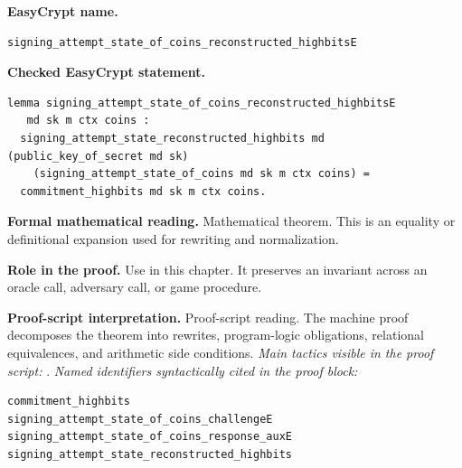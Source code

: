 \begin{formaltheorem}
\noindent\textbf{EasyCrypt name.}
\begin{lstlisting}[language=EasyCrypt,basicstyle=\ttfamily\scriptsize]
signing_attempt_state_of_coins_reconstructed_highbitsE
\end{lstlisting}
\noindent\textbf{Checked EasyCrypt statement.}
\begin{lstlisting}[language=EasyCrypt,basicstyle=\ttfamily\scriptsize]
lemma signing_attempt_state_of_coins_reconstructed_highbitsE
   md sk m ctx coins :
  signing_attempt_state_reconstructed_highbits md (public_key_of_secret md sk)
    (signing_attempt_state_of_coins md sk m ctx coins) =
  commitment_highbits md sk m ctx coins.
\end{lstlisting}
\noindent\textbf{Formal mathematical reading.}
Mathematical theorem. This is an equality or definitional expansion used for rewriting and normalization.

\noindent\textbf{Role in the proof.}
Use in this chapter. It preserves an invariant across an oracle call, adversary call, or game procedure.

\noindent\textbf{Proof-script interpretation.}
Proof-script reading. The machine proof decomposes the theorem into rewrites, program-logic obligations, relational equivalences, and arithmetic side conditions.
\emph{Main tactics visible in the proof script:} .
\emph{Named identifiers syntactically cited in the proof block:}
\begin{lstlisting}[language=EasyCrypt,basicstyle=\ttfamily\scriptsize]
commitment_highbits
signing_attempt_state_of_coins_challengeE
signing_attempt_state_of_coins_response_auxE
signing_attempt_state_reconstructed_highbits
\end{lstlisting}

\end{formaltheorem}

